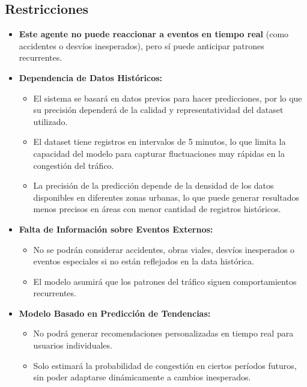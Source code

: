 \documentclass{svproc} %
\begin{document}
\subsection{Restricciones}
\begin{itemize}
    \item \textbf{Este agente no puede reaccionar a eventos en tiempo real} (como accidentes o desvíos
    inesperados), pero sí puede anticipar patrones recurrentes.
    \item \textbf{Dependencia de Datos Históricos:}
    \begin{itemize}
        \item El sistema se basará en datos previos para hacer predicciones, por lo que su
        precisión dependerá de la calidad y representatividad del dataset utilizado.
        \item El dataset tiene registros en intervalos de 5 minutos, lo que limita la capacidad del
        modelo para capturar fluctuaciones muy rápidas en la congestión del tráfico.
        \item La precisión de la predicción depende de la densidad de los datos disponibles en
        diferentes zonas urbanas, lo que puede generar resultados menos precisos en
        áreas con menor cantidad de registros históricos.
    \end{itemize}
    \item \textbf{Falta de Información sobre Eventos Externos:}
    \begin{itemize}
        \item No se podrán considerar accidentes, obras viales, desvíos inesperados o eventos
        especiales si no están reflejados en la data histórica.
        \item El modelo asumirá que los patrones del tráfico siguen comportamientos
        recurrentes.
    \end{itemize}
    \item \textbf{Modelo Basado en Predicción de Tendencias:}
    \begin{itemize}
        \item No podrá generar recomendaciones personalizadas en tiempo real para usuarios
        individuales.
        \item Solo estimará la probabilidad de congestión en ciertos períodos futuros, sin poder
        adaptarse dinámicamente a cambios inesperados.
    \end{itemize}
\end{itemize}
\end{document}
